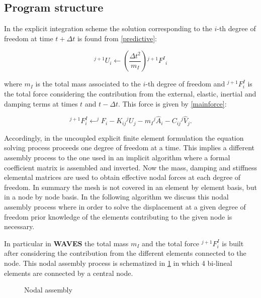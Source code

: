 \documentclass[12pt,letterpaper]{article}
\begin{document}
\subsection*{Program structure}
In the explicit integration scheme the solution corresponding to the $i$-th degree of freedom at time $t + \Delta t$ is found from \cref{predictive}:

\begin{equation}
^{j+1}U_i\longleftarrow \left( \dfrac{\Delta t^2}{m_I}\right) {^{j+1}F^I}_i
\label{predictive}
\end{equation}

where $m_I$ is the total mass associated to the $i$-th degree of freedom and $^{j+1}F^I_i$ is the total force considering the contribution from the external, elastic, inertial and damping terms at times $t$ and $t - \Delta t$. This force is given by \cref{mainforce}:

\begin{equation}
^{j+1}F^I_i\longleftarrow ^{j}F_i-K_{ij} {^{j}U}_j-m_I {^{j} \hat{A}}_i- C_{ij} {^{j} \hat{V} }_j.
\label{mainforce}
\end{equation}


Accordingly, in the uncoupled explicit finite element formulation the equation solving process proceeds one degree of freedom at a time. This implies a different assembly process to the one used in an implicit algorithm where a formal coefficient matrix is assembled and inverted. Now the mass, damping and stiffness elemental matrices are used to obtain effective nodal forces at each degree of freedom. In summary the mesh is not covered in an element by element basis, but in a node by node basis. In the following algorithm we discuss this nodal assembly process where in order to solve the displacement at a given degree of freedom prior knowledge of the elements contributing to the given node is necessary.

In particular in {\bf WAVES} the total mass $m_I$  and the total force $^{j+1}F^I_i$ is built after considering the contribution from the different elements connected to the node. This nodal assembly process is schematized in \cref{fig:ensambla} in which 4 bi-lineal elements are connected by a central node.


\begin{figure}[H]
\centering
{}
\caption{Nodal assembly}
\label{fig:ensambla}
\end{figure}
\end{document}
